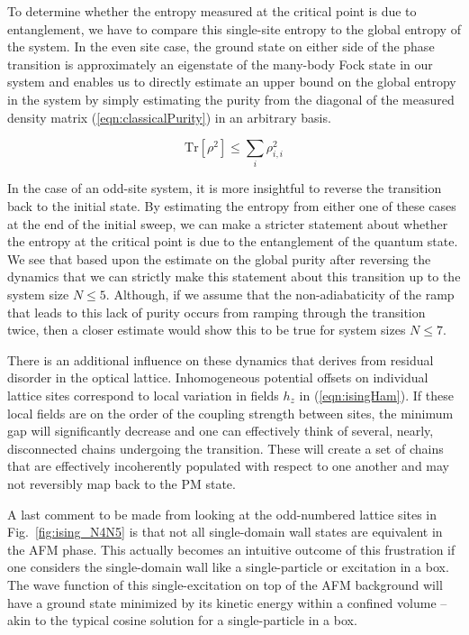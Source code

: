 To determine whether the entropy measured at the critical point is due to entanglement, we have to compare this single-site entropy to the global entropy of the system. In the even site case, the ground state on either side of the phase transition is approximately an eigenstate of the many-body Fock state in our system and enables us to directly estimate an upper bound on the global entropy in the system by simply estimating the purity from the  diagonal of the measured density matrix (\ref{eqn:classicalPurity}) in an arbitrary basis. 

\begin{equation}
\label{eqn:classicalPurity}
\mathrm{Tr} [\rho^2] \leq \sum_i \rho_{i,i}^2
\end{equation}

In the case of an odd-site system, it is more insightful to reverse the transition back to the initial state. By estimating the entropy from either one of these cases at the end of the initial sweep, we can make a stricter statement about whether the entropy at the critical point is due to the entanglement of the quantum state. We see that based upon the estimate on the global purity after reversing the dynamics that we can strictly make this statement about this transition up to the system size $N\leq5$. Although, if we assume that the non-adiabaticity of the ramp that leads to this lack of purity occurs from ramping through the transition twice, then a closer estimate would show this to be true for system sizes $N\leq7$.

There is an additional influence on these dynamics that derives from residual disorder in the optical lattice. Inhomogeneous potential offsets on individual lattice sites correspond to local variation in fields $h_z$ in (\ref{eqn:isingHam}). If these local fields are on the order of the coupling strength between sites, the minimum gap will significantly decrease and one can effectively think of several, nearly, disconnected chains undergoing the transition. These will create a set of chains that are effectively incoherently populated with respect to one another and may not reversibly map back to the PM state.

A last comment to be made from looking at the odd-numbered lattice sites in Fig.~\ref{fig:ising_N4N5} is that not all single-domain wall states are equivalent in the AFM phase. This actually becomes an intuitive outcome of this frustration if one considers the single-domain wall like a single-particle or excitation in a box. The wave function of this single-excitation on top of the AFM background will have a ground state minimized by its kinetic energy within a confined volume -- akin to the typical cosine solution for a single-particle in a box.

